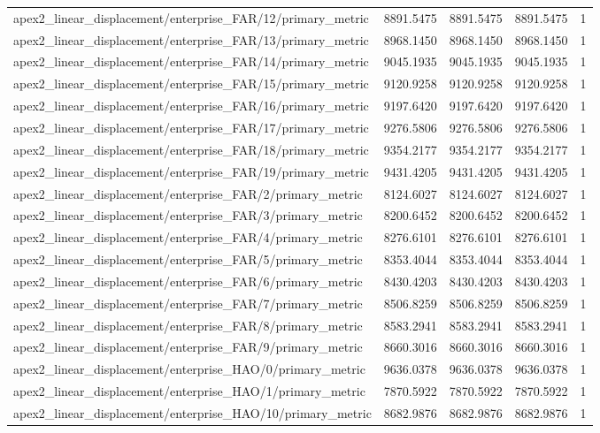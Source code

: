 \begin{table}[h]
\begin{tabular}{lrrrr}
apex2_linear_displacement/enterprise_FAR/12/primary_metric & 8891.5475 & 8891.5475 & 8891.5475 & 1 \\
apex2_linear_displacement/enterprise_FAR/13/primary_metric & 8968.1450 & 8968.1450 & 8968.1450 & 1 \\
apex2_linear_displacement/enterprise_FAR/14/primary_metric & 9045.1935 & 9045.1935 & 9045.1935 & 1 \\
apex2_linear_displacement/enterprise_FAR/15/primary_metric & 9120.9258 & 9120.9258 & 9120.9258 & 1 \\
apex2_linear_displacement/enterprise_FAR/16/primary_metric & 9197.6420 & 9197.6420 & 9197.6420 & 1 \\
apex2_linear_displacement/enterprise_FAR/17/primary_metric & 9276.5806 & 9276.5806 & 9276.5806 & 1 \\
apex2_linear_displacement/enterprise_FAR/18/primary_metric & 9354.2177 & 9354.2177 & 9354.2177 & 1 \\
apex2_linear_displacement/enterprise_FAR/19/primary_metric & 9431.4205 & 9431.4205 & 9431.4205 & 1 \\
apex2_linear_displacement/enterprise_FAR/2/primary_metric & 8124.6027 & 8124.6027 & 8124.6027 & 1 \\
apex2_linear_displacement/enterprise_FAR/3/primary_metric & 8200.6452 & 8200.6452 & 8200.6452 & 1 \\
apex2_linear_displacement/enterprise_FAR/4/primary_metric & 8276.6101 & 8276.6101 & 8276.6101 & 1 \\
apex2_linear_displacement/enterprise_FAR/5/primary_metric & 8353.4044 & 8353.4044 & 8353.4044 & 1 \\
apex2_linear_displacement/enterprise_FAR/6/primary_metric & 8430.4203 & 8430.4203 & 8430.4203 & 1 \\
apex2_linear_displacement/enterprise_FAR/7/primary_metric & 8506.8259 & 8506.8259 & 8506.8259 & 1 \\
apex2_linear_displacement/enterprise_FAR/8/primary_metric & 8583.2941 & 8583.2941 & 8583.2941 & 1 \\
apex2_linear_displacement/enterprise_FAR/9/primary_metric & 8660.3016 & 8660.3016 & 8660.3016 & 1 \\
apex2_linear_displacement/enterprise_HAO/0/primary_metric & 9636.0378 & 9636.0378 & 9636.0378 & 1 \\
apex2_linear_displacement/enterprise_HAO/1/primary_metric & 7870.5922 & 7870.5922 & 7870.5922 & 1 \\
apex2_linear_displacement/enterprise_HAO/10/primary_metric & 8682.9876 & 8682.9876 & 8682.9876 & 1 \\

\end{tabular}
\end{table}
